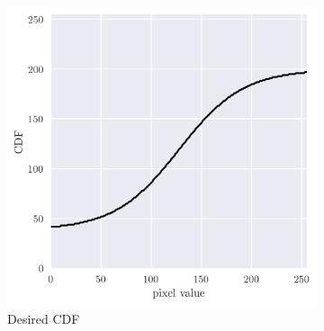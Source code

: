 \documentclass[12pt,a4paper]{article}
\begin{document}
\begin{figure}
	\centering
	\begin{subfigure}[h!]{0.33\textwidth}
		\centering
		\includegraphics[width=\textwidth]{crush_cdf.png}
		\caption{Desired CDF}
		\label{fig:crush-cdf}
	\end{subfigure}
	\begin{subfigure}[h!]{0.24\textwidth}
		\centering

\end{subfigure}
\end{figure}
\end{document}
